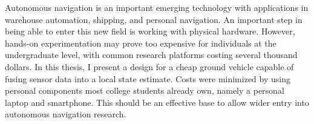 \begin{abstractpage}
Autonomous navigation is an important emerging technology with applications in warehouse automation, shipping, and  personal navigation. An important step in being able to enter this new field is working with physical hardware. However, hands-on experimentation may prove too expensive for individuals at the undergraduate level, with common research platforms costing several thousand dollars. In this thesis, I present a design for a cheap ground vehicle capable of fusing sensor data into a local state estimate. Costs were minimized by using personal components most college students already own, namely a personal laptop and smartphone. This should be an effective base to allow wider entry into autonomous navigation research.
\end{abstractpage}